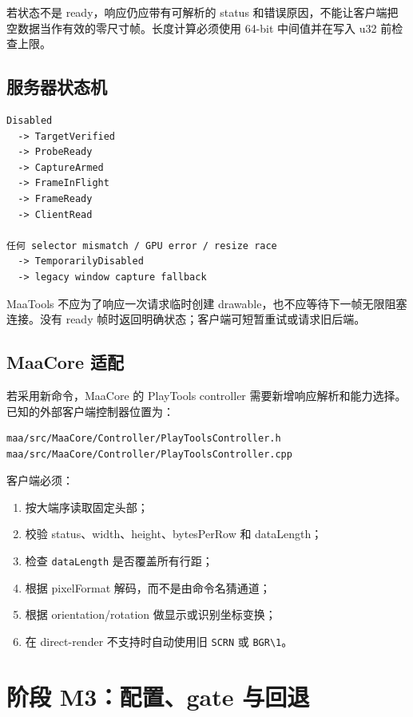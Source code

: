 \documentclass[UTF8,a4paper,11pt]{ctexart}
\begin{document}
若状态不是 ready，响应仍应带有可解析的 status 和错误原因，不能让客户端把空数据当作有效的零尺寸帧。长度计算必须使用 64-bit 中间值并在写入 u32 前检查上限。

\subsection{服务器状态机}

\begin{lstlisting}
Disabled
  -> TargetVerified
  -> ProbeReady
  -> CaptureArmed
  -> FrameInFlight
  -> FrameReady
  -> ClientRead

任何 selector mismatch / GPU error / resize race
  -> TemporarilyDisabled
  -> legacy window capture fallback
\end{lstlisting}

MaaTools 不应为了响应一次请求临时创建 drawable，也不应等待下一帧无限阻塞连接。没有 ready 帧时返回明确状态；客户端可短暂重试或请求旧后端。

\subsection{MaaCore 适配}

若采用新命令，MaaCore 的 PlayTools controller 需要新增响应解析和能力选择。已知的外部客户端控制器位置为：

\begin{lstlisting}
maa/src/MaaCore/Controller/PlayToolsController.h
maa/src/MaaCore/Controller/PlayToolsController.cpp
\end{lstlisting}

客户端必须：

\begin{enumerate}
  \item 按大端序读取固定头部；
  \item 校验 status、width、height、bytesPerRow 和 dataLength；
  \item 检查 \texttt{dataLength} 是否覆盖所有行距；
  \item 根据 pixelFormat 解码，而不是由命令名猜通道；
  \item 根据 orientation/rotation 做显示或识别坐标变换；
  \item 在 direct-render 不支持时自动使用旧 \texttt{SCRN} 或 \texttt{BGR\textbackslash{}1}。
\end{enumerate}

\section{阶段 M3：配置、gate 与回退}
\end{document}
